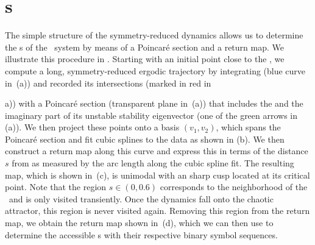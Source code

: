 \section{\Po s}
\label{s:numerics}

The simple structure of the symmetry-reduced dynamics allows us to
determine the \rpo s of the \twomode\ system by means of a Poincar\'e
section and a return map. We illustrate this procedure in
. Starting with an initial point close to the
\REQV{}{}, we compute a long, symmetry-reduced ergodic trajectory by integrating 
 (blue curve in
\,(a)) and recorded its intersections (marked
in red in \,{a)) with a Poincar\'e section
(transparent plane in \,(a)) that includes
the \REQV{}{} and the imaginary part of its unstable stability
eigenvector (one of the green arrows in (a)). 
We then project these points onto a basis $(v_1, v_2)$, which
spans the Poincar\'e section and fit cubic splines to the data as shown in (b). 
We then construct a return map along this curve and express this in terms of the distance $s$ from \REQV{}{}
as measured by the arc length along the cubic spline fit. The resulting map, which is shown in
\,(c), is unimodal with an sharp cusp located at its critical point. 
Note that the region $s \in (0, 0.6)$ corresponds to
the neighborhood of the \reqv\  and is only visited transiently. Once the dynamics fall onto the chaotic
attractor, this region is never visited again. Removing this region from the return map, we
obtain the return map shown in \,(d), which we can then use to determine the 
accessible \rpo s  with their respective binary symbol sequences.

}
